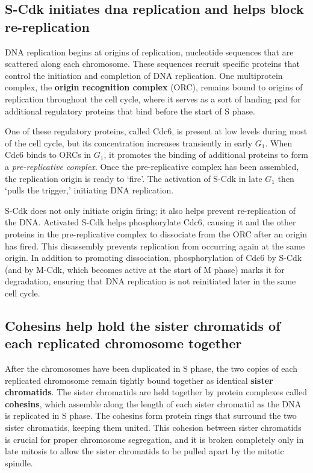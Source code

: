 \subsection{S-Cdk initiates dna replication and helps block re-replication}

DNA replication begins at origins of replication, nucleotide sequences that are scattered along each chromosome.
These sequences recruit specific proteins that control the initiation and
completion of DNA replication. One multiprotein complex, the \textbf{origin
recognition complex} (ORC), remains bound to origins of replication
throughout the cell cycle, where it serves as a sort of landing pad for
additional regulatory proteins that bind before the start of S phase.

One of these regulatory proteins, called Cdc6, is present at low levels
during most of the cell cycle, but its concentration increases transiently
in early $G_1$. When Cdc6 binds to ORCs in $G_1$, it promotes the binding of
additional proteins to form a \textit{pre-replicative complex}. Once the pre-replicative
complex has been assembled, the replication origin is ready to
`fire'. The activation of S-Cdk in late $G_1$ then `pulls the trigger,' initiating
DNA replication.

S-Cdk does not only initiate origin firing; it
also helps prevent re-replication of the DNA. Activated S-Cdk helps phosphorylate
Cdc6, causing it and the other proteins in the pre-replicative
complex to dissociate from the ORC after an origin has fired. This disassembly
prevents replication from occurring again at the same origin. In
addition to promoting dissociation, phosphorylation of Cdc6 by S-Cdk
(and by M-Cdk, which becomes active at the start of M phase) marks it
for degradation, ensuring that DNA replication is not reinitiated later in
the same cell cycle.

\subsection{Cohesins help hold the sister chromatids of each replicated chromosome together}

After the chromosomes have been duplicated in S phase, the two copies
of each replicated chromosome remain tightly bound together as
identical \textbf{sister chromatids}. The sister chromatids are held together by
protein complexes called \textbf{cohesins}, which assemble along the length of
each sister chromatid as the DNA is replicated in S phase. The cohesins
form protein rings that surround the two sister chromatids, keeping them
united. This cohesion between sister chromatids is crucial
for proper chromosome segregation, and it is broken completely only
in late mitosis to allow the sister chromatids to be pulled apart by the
mitotic spindle.

